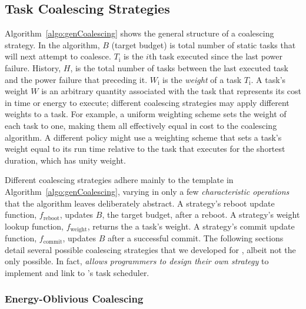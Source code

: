 \subsection{Task Coalescing Strategies}
\label{subsec:coalescingStrategies}

Algorithm~\ref{algo:genCoalescing} shows the general structure of a coalescing strategy. In the algorithm, $B$ (target budget) is total number of static tasks that \sys will next attempt to coalesce. $T_\text{i}$ is the $i$th task executed since the last power failure. History, $H$, is the total number of tasks between the last executed task and the power failure that preceding it. $W_\text{i}$ is the {\em weight} of a task $T_\text{i}$. A task's weight $W$ is an arbitrary quantity associated with the task that represents its cost in time or energy to execute; different coalescing strategies may apply different weights to a task. For example, a uniform weighting scheme sets the weight of each task to one, making them all effectively equal in cost to the coalescing algorithm.  A different policy might use a weighting scheme that sets a task's weight equal to its run time relative to the task that executes for the shortest duration, which has unity weight. 

Different coalescing strategies adhere mainly to the template in Algorithm~\ref{algo:genCoalescing}, varying in only a few {\em characteristic operations} that the algorithm leaves deliberately abstract. A strategy's reboot update function, $f_\text{reboot}$, updates $B$, the target budget, after a reboot. A strategy's weight lookup function, $f_\text{weight}$, returns the a task's weight.  A strategy's commit update function, $f_\text{commit}$, updates $B$ after a successful commit. The following sections detail several possible coalescing strategies that we developed for \sys, albeit not the only possible. In fact, \sys \emph{allows programmers to design their own strategy} to implement and link to \sys’s task scheduler. 

\subsubsection{Energy-Oblivious Coalescing}
\label{subsec:energyBlind}
 

